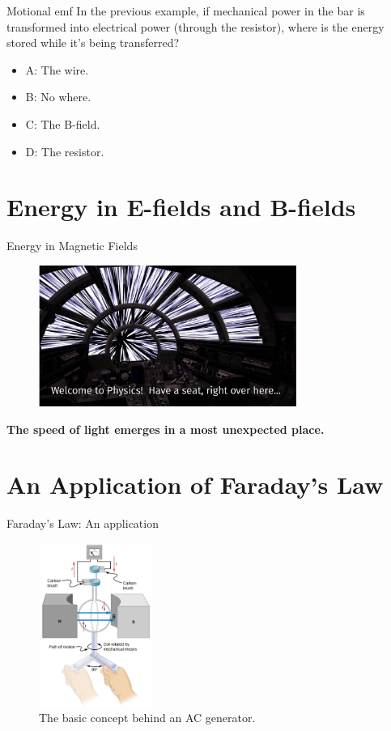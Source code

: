\documentclass{beamer}
\begin{document}
\begin{frame}{Motional emf}
In the previous example, if mechanical power in the bar is transformed into electrical power (through the resistor), where is the energy stored while it's being transferred?
\begin{itemize}
\item A: The wire.
\item B: No where.
\item C: The B-field.
\item D: The resistor.
\end{itemize}
\end{frame}

\section{Energy in E-fields and B-fields}

\begin{frame}{Energy in Magnetic Fields}
\begin{figure}
\center
\includegraphics[width=0.75\textwidth]{figures/hyper.pdf}
\end{figure}
\textbf{The speed of light emerges in a most unexpected place.}
\end{frame}

\section{An Application of Faraday's Law}

\begin{frame}{Faraday's Law: An application}
\small
\begin{figure}
\centering
\includegraphics[width=0.33\textwidth]{figures/gen1.png}
\caption{\label{fig:gen1} The basic concept behind an AC generator.}
\end{figure}
\end{frame}
\end{document}
